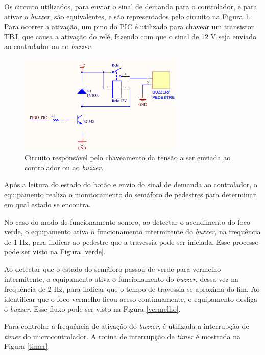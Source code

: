 Os circuito utilizados, para enviar o sinal de demanda para o controlador, e para ativar o \textit{buzzer}, são equivalentes, e são representados pelo circuito na Figura \ref{envio_demanda}. Para ocorrer a ativação, um pino do PIC é utilizado para chavear um transistor \ac{TBJ}, que causa a ativação do relé, fazendo com que o sinal de 12 V seja enviado ao controlador ou ao \textit{buzzer}. 

\begin{figure}[ht]
    \begin{center}
    \includegraphics[width=0.7\textwidth]{figuras/envio_demanda.PNG}
    \end{center}
    \caption[Circuito de chaveamento 12V]{Circuito responsável pelo chaveamento da tensão a ser enviada ao controlador ou ao \textit{buzzer}.}
    \label{envio_demanda}
\end{figure}

Após a leitura do estado do botão e envio do sinal de demanda ao controlador, o equipamento realiza o monitoramento do semáforo de pedestres para determinar em qual estado se encontra.

No caso do modo de funcionamento sonoro, ao detectar o acendimento do foco verde, o equipamento ativa o funcionamento intermitente do \textit{buzzer}, na frequência de 1 Hz, para indicar ao pedestre que a travessia pode ser iniciada. Esse processo pode ser visto na Figura \ref{verde}. 

Ao detectar que o estado do semáforo passou de verde para vermelho intermitente, o equipamento ativa o funcionamento do \textit{buzzer}, dessa vez na frequência de 2 Hz, para indicar que o tempo de travessia se aproxima do fim. Ao identificar que o foco vermelho ficou aceso continuamente, o equipamento desliga o \textit{buzzer}. Esse fluxo pode ser visto na Figura \ref{vermelho}.

Para controlar a frequência de ativação do \textit{buzzer}, é utilizada a interrupção de \textit{timer} do microcontrolador. A rotina de interrupção de \textit{timer} é mostrada na Figura \ref{timer}.

